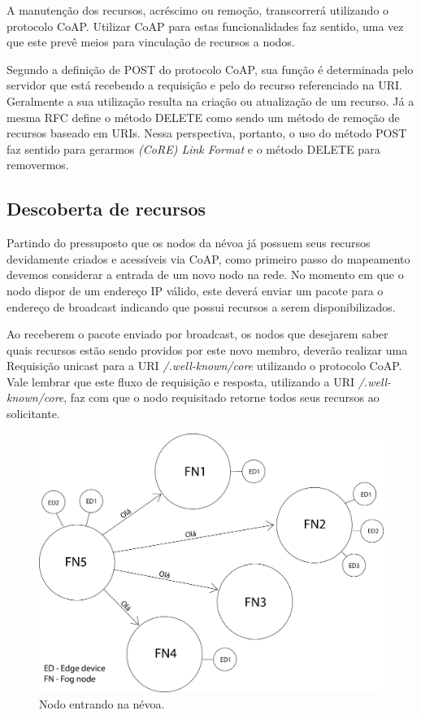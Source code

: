 A manutenção dos recursos, acréscimo ou remoção, transcorrerá utilizando o protocolo CoAP.
Utilizar CoAP para estas funcionalidades faz sentido, uma vez que este prevê meios para vinculação de recursos a nodos.

Segundo a definição de POST do protocolo CoAP, sua função é determinada pelo servidor que está recebendo a requisição e pelo do recurso referenciado na URI.
Geralmente a sua utilização resulta na criação ou atualização de um recurso\cite{rfc7252}.
Já a mesma RFC define o método DELETE como sendo um método de remoção de recursos baseado em URIs\cite{rfc7252}.
Nessa perspectiva, portanto, o uso do método POST faz sentido para gerarmos \textit{(CoRE) Link Format} e o método DELETE para removermos.


\subsection{Descoberta de recursos}


Partindo do pressuposto que os nodos da névoa já possuem seus recursos devidamente criados e acessíveis via CoAP,
como primeiro passo do mapeamento devemos considerar a entrada de um novo nodo na rede.
No momento em que o nodo dispor de um endereço IP válido, este deverá enviar um pacote para o endereço de broadcast indicando que possui recursos a serem disponibilizados.


Ao receberem o pacote enviado por broadcast, os nodos que desejarem saber quais recursos estão sendo providos por este novo membro, deverão realizar uma Requisição
unicast para a URI \textit{/.well-known/core} utilizando o protocolo CoAP.
Vale lembrar que este fluxo de requisição e resposta, utilizando a URI \textit{/.well-known/core}, faz com que o nodo requisitado retorne todos seus recursos ao solicitante.

\begin{figure}[htb!]
    \centering\includegraphics[width=.5\textwidth]{fig5.png}
    \caption%
    {\label{fig:fig5} Nodo entrando na névoa.}
\end{figure}

